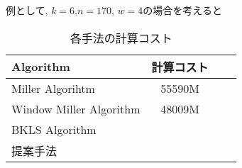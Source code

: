 \par

例として, $k=6$,$n=170$, $w=4$の場合を考えると

\begin{table}[htbp]
 \begin{center}
  \begin{tabular}{|l|c|c|c|}
  \hline
  Algorithm & 計算コスト \\
  \hline
  Miller Algorihtm & 55590M \\
  \hline
  Window Miller Algorithm & 48009M \\
  \hline
  BKLS Algorithm &   \\
  \hline
  提案手法 &  \\
  \hline
  \end{tabular}
 \end{center}
 \caption{各手法の計算コスト}
\end{table}
